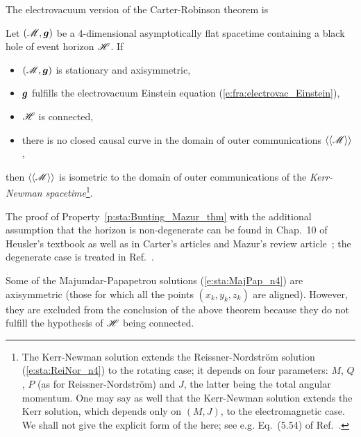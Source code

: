The electrovacuum version of the Carter-Robinson theorem is

\begin{prop}
\label{p:sta:Bunting_Mazur_thm}
Let $(\mathscr{M},\bm{g})$ be a 4-dimensional asymptotically flat spacetime
containing a black hole of event horizon $\mathscr{H}$. If
\begin{itemize}
\item $(\mathscr{M},\bm{g})$ is stationary and axisymmetric,
\item $\bm{g}$ fulfills the electrovacuum Einstein equation (\ref{e:fra:electrovac_Einstein}),
\item $\mathscr{H}$ is connected,
\item there is no closed causal curve in the domain of outer communications $\langle\langle \mathscr{M}\rangle\rangle$,
\end{itemize}
then $\langle\langle \mathscr{M}\rangle\rangle$ is isometric
to the domain of outer communications of the
\emph{Kerr-Newman spacetime}\footnote{The Kerr-Newman
solution extends the Reissner-Nordström solution (\ref{e:sta:ReiNor_n4}) to
the rotating case; it depends on four parameters: $M$, $Q$, $P$ (as for Reissner-Nordström)
and $J$, the latter being the total angular momentum.
One may say as well that the Kerr-Newman solution extends the Kerr solution,
which depends only on $(M,J)$, to the electromagnetic case.
We shall not give
the explicit form of the  here; see e.g. Eq.~(5.54) of Ref.~\cite{Carte73a}.}.
\end{prop}
The proof of Property~\ref{p:sta:Bunting_Mazur_thm}
with the additional assumption that the horizon is non-degenerate
can be found in Chap.~10 of Heusler's textbook \cite{Heusl96}
as well as in Carter's articles \cite{Carte85,Carte87} and Mazur's review article~\cite{Mazur01}; the degenerate case is treated in
Ref.~\cite{ChrusN10}.

\begin{remark}
Some of the Majumdar-Papapetrou solutions
(\ref{e:sta:MajPap_n4})
are axisymmetric (those for which all the points $(x_k,y_k,z_k)$ are aligned).
However, they are excluded from the conclusion of the above theorem because they
do not fulfill the hypothesis of $\mathscr{H}$ being connected.
\end{remark}

